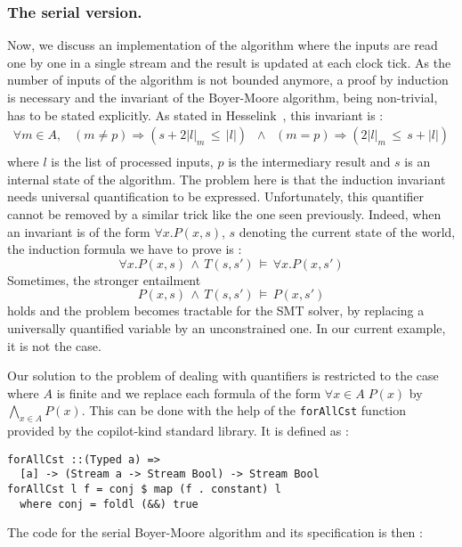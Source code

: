 \subsubsection{The serial version.} Now, we discuss an implementation
of the algorithm where the inputs are read one by one in a single
stream and the result is updated at each clock tick. As the number of
inputs of the algorithm is not bounded anymore, a proof by induction
is necessary and the invariant of the Boyer-Moore algorithm, being
non-trivial, has to be stated explicitly. As stated in
Hesselink~\cite{Hesselink2005}, this invariant is :
\[ \begin{array}{c}
\forall m \in A, \;\;\; \left(m \neq p\right) \Longrightarrow \left( s + 2|l|_m \,\leq\, |l| \right) \;\; \wedge \;\; \left(m = p\right) \Longrightarrow \left( 2|l|_m \,\leq\, s + |l| \right)
\\

\end{array} \]
where $l$ is the list of processed inputs, $p$ is the intermediary result and $s$ is an internal state of the algorithm. The problem here is that the induction invariant needs universal quantification to be expressed. Unfortunately, this quantifier cannot be removed by a similar trick like the one seen previously. Indeed, when an invariant is of the form $\forall x. P(x, s)$, $s$ denoting the current state of the world, the induction formula we have to prove is :
\[ \forall x. P(x, s) \,\wedge\, T\left(s, s' \right) \,\models\, \forall x. P(x, s') \]
Sometimes, the stronger entailment 
\[ P(x, s) \,\wedge\, T\left(s, s' \right) \,\models\, P(x, s') \]
holds and the problem becomes tractable for the SMT solver, by replacing a universally quantified variable by an unconstrained one. In our current example, it is not the case. 


Our solution to the problem of dealing with quantifiers is restricted to the
case where $A$ is finite and we replace each formula of the form $\forall x \in A
\; P(x)$ by $\bigwedge_{x \in A} P(x)$. This can be done with the help of the
\texttt{forAllCst} function provided by the copilot-kind standard library. It is
defined as :
\begin{lstlisting}[frame=single]
forAllCst ::(Typed a) => 
  [a] -> (Stream a -> Stream Bool) -> Stream Bool
forAllCst l f = conj $ map (f . constant) l
  where conj = foldl (&&) true
\end{lstlisting}
The code for the serial Boyer-Moore algorithm and its specification is then :

